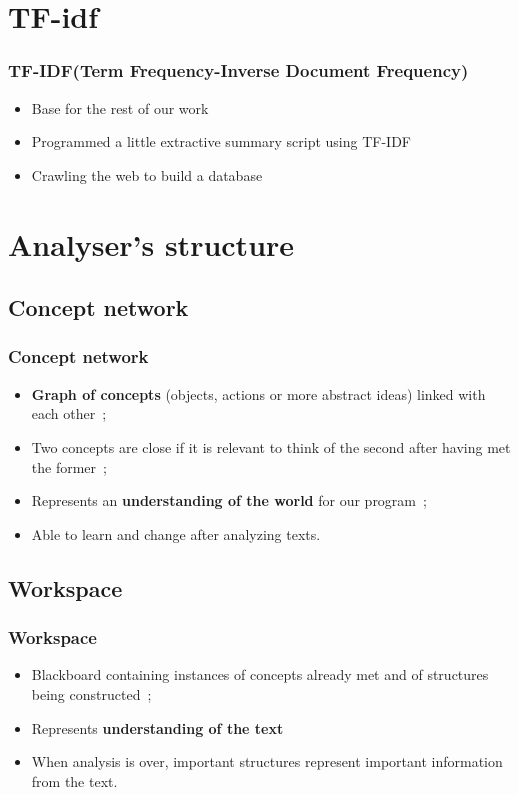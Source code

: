 \documentclass{beamer}
\begin{document}
\section{TF-idf}
    \begin{frame}
    \frametitle{TF-IDF(Term Frequency-Inverse Document Frequency)}
        \begin{itemize}
          \item Base for the rest of our work
          \item Programmed a little extractive summary script using TF-IDF
          \item Crawling the web to build a database
        \end{itemize}
    \end{frame}

\section{Analyser's structure}%
    \subsection{Concept network}
        \begin{frame}
        \frametitle{Concept network}
            \begin{itemize}
                \item \textbf{Graph of concepts} (objects, actions or more abstract ideas) linked with each other~;
                \item Two concepts are close if it is relevant to think of the second after having met the former~;
                \item Represents an \textbf{understanding of the world} for our program~;
                \item Able to learn and change after analyzing texts.
            \end{itemize}
        \end{frame}

    \subsection{Workspace}
        \begin{frame}
        \frametitle{Workspace}
            \begin{itemize}
                \item Blackboard containing instances of concepts already met and of structures being constructed~; 
                \item Represents \textbf{understanding of the text}
                \item When analysis is over, important structures represent important information from the text.
            \end{itemize}
        \end{frame}
\end{document}
